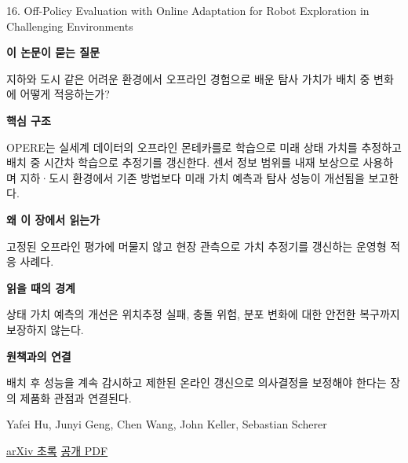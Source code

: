 \documentclass[11pt,openany]{book}
\begin{document}
\begin{termcard}{16. Off-Policy Evaluation with Online Adaptation for Robot Exploration in Challenging Environments}

\par

\medskip

{\sffamily\bfseries\color{deepblue} 이 논문이 묻는 질문}\par

지하와 도시 같은 어려운 환경에서 오프라인 경험으로 배운 탐사 가치가 배치 중 변화에 어떻게 적응하는가?

\smallskip

{\sffamily\bfseries\color{deepblue} 핵심 구조}\par

OPERE는 실세계 데이터의 오프라인 몬테카를로 학습으로 미래 상태 가치를 추정하고 배치 중 시간차 학습으로 추정기를 갱신한다. 센서 정보 범위를 내재 보상으로 사용하며 지하·도시 환경에서 기존 방법보다 미래 가치 예측과 탐사 성능이 개선됨을 보고한다.

\smallskip

{\sffamily\bfseries\color{deepblue} 왜 이 장에서 읽는가}\par

고정된 오프라인 평가에 머물지 않고 현장 관측으로 가치 추정기를 갱신하는 운영형 적응 사례다.

\smallskip

{\sffamily\bfseries\color{coral} 읽을 때의 경계}\par

상태 가치 예측의 개선은 위치추정 실패, 충돌 위험, 분포 변화에 대한 안전한 복구까지 보장하지 않는다.

\smallskip

{\sffamily\bfseries\color{teal} 원책과의 연결}\par

배치 후 성능을 계속 감시하고 제한된 온라인 갱신으로 의사결정을 보정해야 한다는 장의 제품화 관점과 연결된다.

\medskip

{\footnotesize\color{muted} Yafei Hu, Junyi Geng, Chen Wang, John Keller, Sebastian Scherer\par

\href{https://arxiv.org/abs/2204.03140}{arXiv 초록} \quad \href{https://arxiv.org/pdf/2204.03140}{공개 PDF}\par}

\end{termcard}
\end{document}
